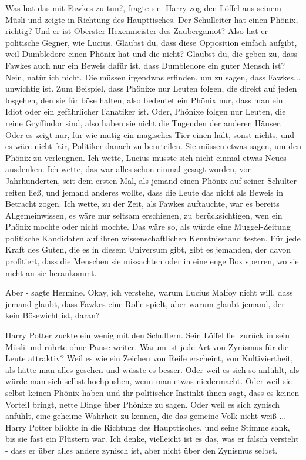\glqq Was hat das mit Fawkes zu tun?\grqq{}, fragte sie. Harry zog den Löffel
aus seinem Müsli und zeigte in Richtung des Haupttisches. \glqq Der Schulleiter
hat einen Phönix, richtig? Und er ist Oberster Hexenmeister des Zaubergamot?
Also hat er politische Gegner, wie Lucius. Glaubst du, dass diese Opposition
einfach aufgibt, weil Dumbledore einen Phönix hat und die nicht? Glaubst du, die
geben zu, dass Fawkes auch nur ein Beweis dafür ist, dass Dumbledore ein guter
Mensch ist? Nein, natürlich nicht. Die müssen irgendwas erfinden, um zu sagen,
dass Fawkes... unwichtig ist. Zum Beispiel, dass Phönixe nur Leuten folgen, die
direkt auf jeden losgehen, den sie für böse halten, also bedeutet ein Phönix
nur, dass man ein Idiot oder ein gefährlicher Fanatiker ist. Oder, Phönixe
folgen nur Leuten, die reine Gryffindor sind, also haben sie nicht die Tugenden
der anderen Häuser. Oder es zeigt nur, für wie mutig ein magisches Tier einen
hält, sonst nichts, und es wäre nicht fair, Politiker danach zu beurteilen. Sie
müssen etwas sagen, um den Phönix zu verleugnen. Ich wette, Lucius musste sich
nicht einmal etwas Neues ausdenken. Ich wette, das war alles schon einmal gesagt
worden, vor Jahrhunderten, seit dem ersten Mal, als jemand einen Phönix auf
seiner Schulter reiten ließ, und jemand anderes wollte, dass die Leute das nicht
als Beweis in Betracht zogen. Ich wette, zu der Zeit, als Fawkes auftauchte, war
es bereits Allgemeinwissen, es wäre nur seltsam erschienen, zu berücksichtigen,
wen ein Phönix mochte oder nicht mochte. Das wäre so, als würde eine
Muggel-Zeitung politische Kandidaten auf ihren wissenschaftlichen Kenntnisstand
testen. Für jede Kraft des Guten, die es in diesem Universum gibt, gibt es
jemanden, der davon profitiert, dass die Menschen sie missachten oder in eine
enge Box sperren, wo sie nicht an sie herankommt.\grqq{}

\glqq Aber -\grqq{} sagte Hermine. \glqq Okay, ich verstehe, warum Lucius Malfoy
nicht will, dass jemand glaubt, dass Fawkes eine Rolle spielt, aber warum glaubt
jemand, der kein Bösewicht ist, daran?\grqq{}

Harry Potter zuckte ein wenig mit den Schultern. Sein Löffel fiel zurück in sein
Müsli und rührte ohne Pause weiter. \glqq Warum ist jede Art von Zynismus für
die Leute attraktiv? Weil es wie ein Zeichen von Reife erscheint, von
Kultiviertheit, als hätte man alles gesehen und wüsste es besser. Oder weil es
sich so anfühlt, als würde man sich selbst hochpushen, wenn man etwas
niedermacht. Oder weil sie selbst keinen Phönix haben und ihr politischer
Instinkt ihnen sagt, dass es keinen Vorteil bringt, nette Dinge über Phönixe zu
sagen. Oder weil es sich zynisch anfühlt, eine geheime Wahrheit zu kennen, die
das gemeine Volk nicht weiß ...\grqq{} Harry Potter blickte in die Richtung des
Haupttisches, und seine Stimme sank, bis sie fast ein Flüstern war. \glqq Ich
denke, vielleicht ist es das, was er falsch versteht - dass er über alles andere
zynisch ist, aber nicht über den Zynismus selbst.\grqq{}

